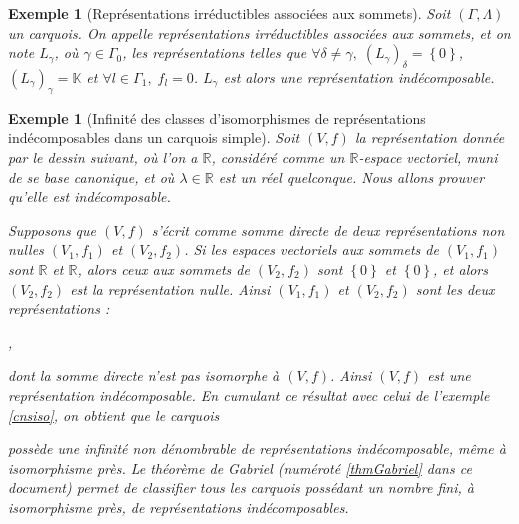 \documentclass[a4paper,11pt]{article}
\newtheorem{ex}[thm]{Exemple}%
\begin{document}
\begin{ex}[Représentations irréductibles associées aux sommets]
\label{irreductible}
Soit $(\Gamma,\Lambda)$ un carquois. On appelle \emph{représentations irréductibles associées aux sommets}, et on note $L_\gamma$, où $\gamma\in\Gamma_{0}$, les représentations telles que $\forall\delta\neq\gamma,\;(L_\gamma)_\delta=\left\{ 0 \right\}$,  $(L_\gamma)_\gamma=\mathbb K$ et $\forall l \in\Gamma_1,\;f_l=0$. $L_\gamma$ est alors une représentation indécomposable.
\end{ex}
\begin{ex}[Infinité des classes d'isomorphismes de représentations indécomposables dans un carquois simple]
	Soit $(V,f)$ la représentation donnée par le dessin suivant, où l'on a $\mathbb R$, considéré comme un $\mathbb R$-espace vectoriel, muni de se base canonique, et où $\lambda\in\mathbb R$ est un réel quelconque. Nous allons prouver qu'elle est indécomposable.
	\begin{center}
	\end{center}
	Supposons que $(V,f)$ s'écrit comme somme directe de deux représentations non nulles $(V_1,f_1)$ et $(V_2,f_2)$. Si les espaces vectoriels aux sommets de $(V_1,f_1)$ sont $\mathbb R$ et $\mathbb R$, alors ceux aux sommets de $(V_2,f_2)$ sont $\left\{ 0 \right\}$ et $\left\{ 0 \right\}$, et alors $(V_2,f_2)$ est la représentation nulle. Ainsi $(V_1,f_1)$ et $(V_2,f_2)$ sont les deux représentations :
\begin{center}
	,
	\end{center}
	dont la somme directe n'est pas isomorphe à $(V,f)$. Ainsi $(V,f)$ est une représentation indécomposable. En cumulant ce résultat avec celui de l'exemple \ref{cnsiso}, on obtient que le carquois
		possède une infinité non dénombrable de représentations indécomposable, même à isomorphisme près. Le théorème de Gabriel (numéroté \ref{thmGabriel} dans ce document) permet de classifier tous les carquois possédant un nombre fini, à isomorphisme près, de représentations indécomposables.
\end{ex}
\end{document}
